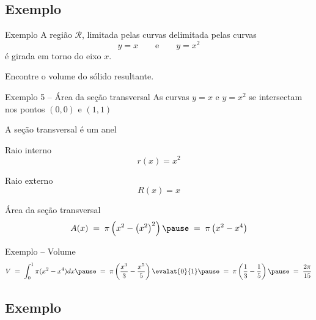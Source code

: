 \addtocounter{exemplo}{1}
\subsection{Exemplo \theexemplo}

\begin{frame}{Exemplo \theexemplo{}}
A região $\mathcal{R}$, limitada pelas curvas delimitada pelas curvas
\[
  y = x
  \qquad\text{e}\qquad
  y = x^2
\]
é girada em torno do eixo $x$.

\vspace{\baselineskip}
Encontre o volume do sólido resultante.
\end{frame}


\begin{frame}{Exemplo 5 -- Área da seção transversal}
As curvas $y = x$ e $y = x^2$ se intersectam nos pontos $(0, 0)$ e $(1, 1)$

\pause
\vspace{0.5\baselineskip}
A seção transversal é um anel

\pause
\vspace{0.5\baselineskip}
Raio interno
\[
  r(x) = x^2
\]

\pause
Raio externo
\[
  R(x) = x
\]

\pause
Área da seção transversal
\[
  A(x)
  \;=\; \pi \left( x^2 - \left(x^2\right)^2 \right)
  \pause
  \;=\; \pi \left( x^2 - x^4 \right)
\]
\end{frame}

\begin{frame}{Exemplo \theexemplo{} -- Volume}
  \[
    V
    \;=\; \int_0^1 \pi (x^2-x^4) dx
    \pause
    \;=\; \pi \left( \frac{x^3}{3}-\frac{x^5}{5} \right) \evalat{0}{1}
    \pause
    \;=\; \pi \left( \frac{1}{3} - \frac{1}{5} \right)
    \pause
    \;=\; \frac{2\pi}{15}
  \]
\end{frame}

\addtocounter{exemplo}{1}
\subsection{Exemplo \theexemplo}

